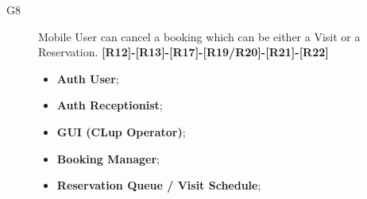 \begin{description}
    \item[G8]Mobile User can cancel a booking which can be either a Visit or a Reservation. \textbf{[R12]-[R13]-[R17]-[R19/R20]-[R21]-[R22]}
    \begin{itemize}
        \item \textbf{Auth User};
        \item \textbf{Auth Receptionist};
        \item \textbf{GUI (CLup Operator)};  
        \item \textbf{Booking Manager}; 
        \item \textbf{Reservation Queue / Visit Schedule};  
    \end{itemize}
    
\end{description}
